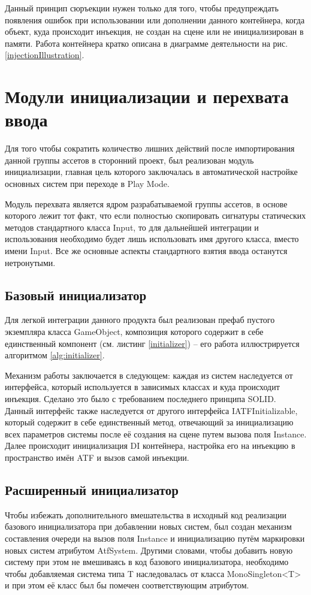 Данный принцип сюръекции нужен только для того, чтобы предупреждать появления ошибок при использовании или дополнении данного контейнера, когда объект, куда происходит инъекция, не создан на сцене или не инициализирован в памяти. Работа контейнера кратко описана в диаграмме деятельности на рис. \ref{injectionIllustration}.

\section{Модули инициализации и перехвата ввода}
Для того чтобы сократить количество лишних действий после импортирования данной группы ассетов в сторонний проект, был реализован модуль инициализации, главная цель которого заключалась в автоматической настройке основных систем при переходе в Play Mode.

Модуль перехвата является ядром разрабатываемой группы ассетов, в основе которого лежит тот факт, что если полностью скопировать сигнатуры статических методов стандартного класса Input, то для дальнейшей интеграции и использования необходимо будет лишь использовать имя другого класса, вместо имени Input. Все же основные аспекты стандартного взятия ввода останутся нетронутыми.

\subsection{Базовый инициализатор}
Для легкой интеграции данного продукта был реализован префаб пустого экземпляра класса GameObject, композиция которого содержит в себе единственный компонент (см. листинг \ref{initializer}) -- его работа  иллюстрируется алгоритмом \ref{alg:initializer}.

Механизм работы заключается в следующем: каждая из систем наследуется от интерфейса, который используется в зависимых классах и куда происходит инъекция. Сделано это было с требованием последнего принципа SOLID. Данный интерфейс также наследуется от другого интерфейса IATFInitializable, который содержит в себе единственный метод, отвечающий за инициализацию всех параметров системы после её создания на сцене путем вызова поля Instance. Далее происходит инициализация DI контейнера, настройка его на инъекцию в пространство имён ATF и вызов самой инъекции.

\subsection{Расширенный инициализатор}
Чтобы избежать дополнительного вмешательства в исходный код реализации базового инициализатора при добавлении новых систем, был создан механизм составления очереди на вызов поля Instance и инициализацию путём маркировки новых систем атрибутом AtfSystem. Другими словами, чтобы добавить новую систему при этом не вмешиваясь в код базового инициализатора, необходимо чтобы добавляемая система типа T наследовалась от класса MonoSingleton<T> и при этом её класс был бы помечен соответствующим атрибутом.

